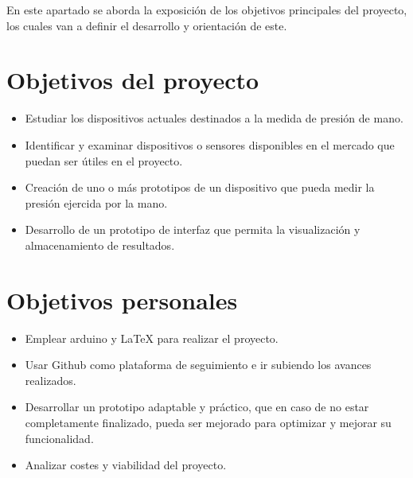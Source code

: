 En este apartado se aborda la exposición de los objetivos principales del proyecto, los cuales van a definir el desarrollo y orientación de este.
\section{Objetivos del proyecto}
\begin{itemize}
    \item Estudiar los dispositivos actuales destinados a la medida de presión de mano.
    \item Identificar y examinar dispositivos o sensores disponibles en el mercado que puedan ser útiles en el proyecto.
    \item Creación de uno o más prototipos de un dispositivo que pueda medir la presión ejercida por la mano.
    \item Desarrollo de un prototipo de interfaz que permita la visualización y almacenamiento de resultados.
\end{itemize}
\section{Objetivos personales}
\begin{itemize}
    \item Emplear arduino y LaTeX para realizar el proyecto. 
    \item Usar Github como plataforma de seguimiento e ir subiendo los avances realizados.
    \item Desarrollar un prototipo adaptable y práctico, que en caso de no estar completamente finalizado, pueda ser mejorado para optimizar y mejorar su funcionalidad.
    \item Analizar costes y viabilidad del proyecto.  
\end{itemize}